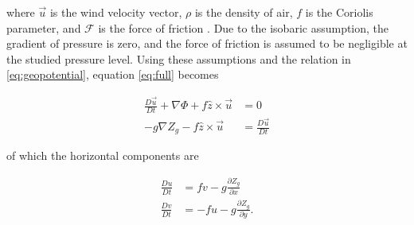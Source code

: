 where $\vec{u}$ is the wind velocity vector, $\rho$ is the density of air, $f$ is the Coriolis parameter, and $\mathcal{F}$ is the force of friction \cite{marshall_atmosphere_2008}. 
Due to the isobaric assumption, the gradient of pressure is zero, and the force of friction is assumed to be negligible at the studied pressure level.
Using these assumptions and the relation in \ref{eq:geopotential}, equation \ref{eq:full} becomes

\begin{align}
    \frac{D \vec{u}}{Dt} + \nabla \Phi + f \hat{z} \times \vec{u} &= 0 \\
    - g \nabla Z_g - f \hat{z} \times \vec{u} &= \frac{D \vec{u}}{Dt}
\end{align}

of which the horizontal components are

\begin{align}
    \frac{Du}{Dt} &= fv - g \frac{\partial Z_g}{\partial x} \label{eq:uvelocity} \\
    \frac{Dv}{Dt} &= -fu - g \frac{\partial Z_g}{\partial y}. \label{eq:vvelocity}
\end{align}

